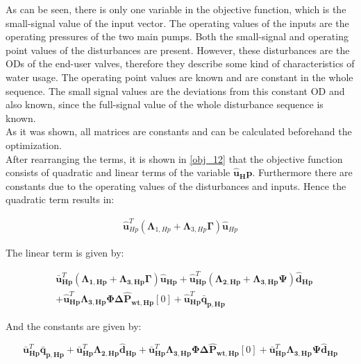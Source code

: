 As can be seen, there is only one variable in the objective function, which is the small-signal value of the input vector. The operating values of the inputs are the operating pressures of the two main pumps. Both the small-signal and operating point values of the disturbances are present. However, these disturbances are the ODs of the end-user valves, therefore they describe some kind of characteristics of water usage. The operating point values are known and are constant in the whole sequence. The small signal values are the deviations from this constant OD and also known, since the full-signal value of the whole disturbance sequence is known.
\\
As it was shown, all matrices are constants and can be calculated beforehand the optimization. 
\\
After rearranging the terms, it is shown in \eqref{obj_12} that the objective function consists of quadratic and linear terms of the variable $\bm{\hat{u}_Hp}$. Furthermore there are constants due to the operating values of the disturbances and inputs. Hence the quadratic term results in:

\begin{equation}
  \begin{split}
   \bm{\hat{u}}_{Hp}^{T}(\bm{\Lambda}_{1,Hp} + \bm{\Lambda}_{3,Hp} \bm{\Gamma} ) \bm{\hat{u}}_{Hp}
  \end{split}
\end{equation}

The linear term is given by: 

\begin{equation}
  \begin{split}
    & \bm{\bar{u}}_{\bm{Hp}}^{T}(\bm{\Lambda}_{\bm{1,Hp}} + \bm{\Lambda}_{\bm{3,Hp}} \bm{\Gamma} ) \bm{\hat{u}}_{\bm{Hp}} + \bm{\hat{u}}_{\bm{Hp}}^{T}(\bm{\Lambda}_{\bm{2,Hp}} + \bm{\Lambda}_{\bm{3,Hp}} \bm{\Psi} ) \bm{\hat{d}}_{\bm{Hp}}
    \\
    & + \bm{\hat{u}}_{\bm{Hp}}^{T}\bm{\Lambda}_{\bm{3,Hp}} \bm{\Phi} \bm{\Delta \hat{P}_{\bm{wt,Hp}}}[0] + \bm{\hat{u}}_{\bm{Hp}}^{T} \bm{\bar{q}}_{\bm{p,Hp}}
  \end{split}
\end{equation}

And the constants are given by:

\begin{equation}
    \bm{\bar{u}}_{\bm{Hp}}^{T}\bm{\bar{q}}_{\bm{p,Hp}}  + \bm{\bar{u}}_{\bm{Hp}}^{T}\bm{\Lambda}_{\bm{2,Hp}}\bm{\hat{d}}_{\bm{Hp}} + \bm{\bar{u}}_{\bm{Hp}}^{T}\bm{\Lambda}_{\bm{3,Hp}}\bm{\Phi} \bm{\Delta \hat{P}_{\bm{wt,Hp}}}[0] + \bm{\bar{u}}_{\bm{Hp}}^{T}\bm{\Lambda}_{\bm{3,Hp}}\bm{\Psi}\bm{\hat{d}}_{\bm{Hp}}
\end{equation}


